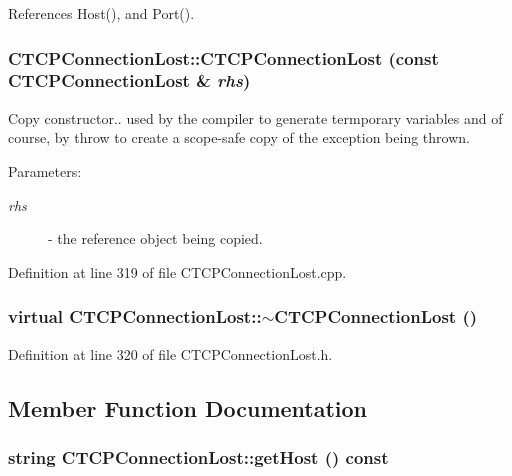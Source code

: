 References Host(), and Port().
\subsubsection{\setlength{\rightskip}{0pt plus 5cm}CTCPConnection\-Lost::CTCPConnection\-Lost (const CTCPConnection\-Lost \& {\em rhs})}\label{classCTCPConnectionLost_a1}


Copy constructor.. used by the compiler to generate termporary variables and of course, by throw to create a scope-safe copy of the exception being thrown. \begin{Desc}
\item[Parameters: ]\par
\begin{description}
\item[{\em 
rhs}]- the reference object being copied. \end{description}
\end{Desc}


Definition at line 319 of file CTCPConnection\-Lost.cpp.
\subsubsection{\setlength{\rightskip}{0pt plus 5cm}virtual CTCPConnection\-Lost::$\sim$CTCPConnection\-Lost ()\hspace{0.3cm}{\tt  [inline, virtual]}}\label{classCTCPConnectionLost_a2}




Definition at line 320 of file CTCPConnection\-Lost.h.

\subsection{Member Function Documentation}
\subsubsection{\setlength{\rightskip}{0pt plus 5cm}string CTCPConnection\-Lost::get\-Host () const\hspace{0.3cm}{\tt  [inline]}}\label{classCTCPConnectionLost_a5}




